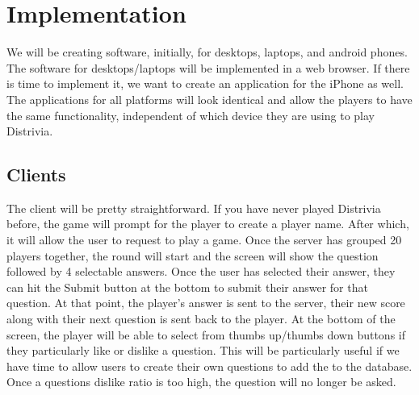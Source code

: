 \documentclass{dependencies/acm_proc_article-sp}
\begin{document}
\section{Implementation}
We will be creating software, initially, for desktops, laptops, and android phones.
The software for desktops/laptops will be implemented in a web browser.
If there is time to implement it, we want to create an application for the iPhone as well.
The applications for all platforms will look identical and allow the players to have the same functionality, independent of which device they are using to play Distrivia.

\subsection{Clients}
The client will be pretty straightforward.
If you have never played Distrivia before, the game will prompt for the player to create a player name.
After which, it will allow the user to request to play a game.
Once the server has grouped 20 players together, the round will start and the screen will show the question followed by 4 selectable answers.
Once the user has selected their answer, they can hit the Submit button at the bottom to submit their answer for that question.
At that point, the player's answer is sent to the server, their new score along with their next question is sent back to the player.
At the bottom of the screen, the player will be able to select from thumbs up/thumbs down buttons if they particularly like or dislike a question.
This will be particularly useful if we have time to allow users to create their own questions to add the to the database.
Once a questions dislike ratio is too high, the question will no longer be asked.
\end{document}
